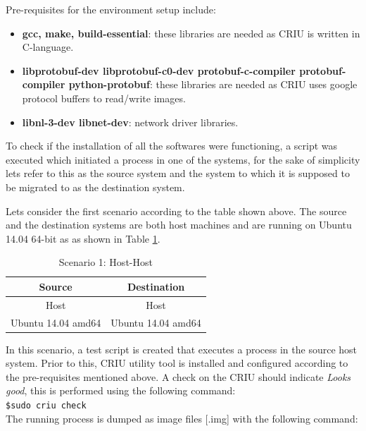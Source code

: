 \documentclass[conference]{IEEEtran}
\begin{document}
Pre-requisites for the environment setup include:
\begin{itemize}
    \item \textbf{gcc, make, build-essential}: these libraries are needed as CRIU is written in C-language.
    \item \textbf{libprotobuf-dev libprotobuf-c0-dev protobuf-c-compiler protobuf-compiler python-protobuf}: these libraries are needed as CRIU uses google protocol buffers to read/write images.
    \item \textbf{libnl-3-dev libnet-dev}: network driver libraries.
\end{itemize}

To check if the installation of all the softwares were functioning, a script was executed which initiated a process in one of the systems, for the sake of simplicity lets refer to this as the source system and the system to which it is supposed to be migrated to as the destination system.

Lets consider the first scenario according to the table shown above. The source and the destination systems are both host machines and are running on Ubuntu 14.04 64-bit as as shown in Table \ref{table 2}. 

\begin{table}[htbp]
\caption{Scenario 1: Host-Host}
\begin{center}
\begin{tabular}{|c|c|}
\hline
\textbf{Source}&\textbf{Destination} \\
\cline{1-2} 
\hline
Host & Host  \\
Ubuntu 14.04 amd64 & Ubuntu 14.04 amd64 \\
\hline
\end{tabular}
\label{table 2}
\end{center}
\end{table}


In this scenario, a test script is created that executes a process in the source host system. Prior to this, CRIU utility tool is installed and configured according to the pre-requisites mentioned above. A check on the CRIU should indicate \emph{Looks good}, this is performed using the following command: \\

\noindent\verb|$sudo criu check| \\

The running process is dumped as image files [.img] with the following command: \\
\end{document}
